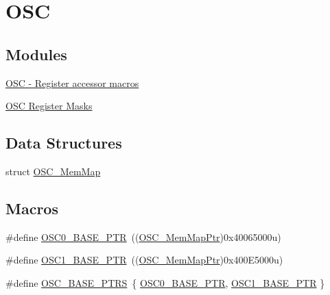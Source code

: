 \hypertarget{group___o_s_c___peripheral}{}\section{O\+S\+C}
\label{group___o_s_c___peripheral}
\subsection*{Modules}
\begin{DoxyCompactItemize}
\item 
\hyperlink{group___o_s_c___register___accessor___macros}{O\+S\+C -\/ Register accessor macros}
\item 
\hyperlink{group___o_s_c___register___masks}{O\+S\+C Register Masks}
\end{DoxyCompactItemize}
\subsection*{Data Structures}
\begin{DoxyCompactItemize}
\item 
struct \hyperlink{struct_o_s_c___mem_map}{O\+S\+C\+\_\+\+Mem\+Map}
\end{DoxyCompactItemize}
\subsection*{Macros}
\begin{DoxyCompactItemize}
\item 
\#define \hyperlink{group___o_s_c___peripheral_gaab1618c69a91b2e5d3385139b5b566f0}{O\+S\+C0\+\_\+\+B\+A\+S\+E\+\_\+\+P\+T\+R}~((\hyperlink{group___o_s_c___peripheral_gaaa685163f549fdf24c28ec9b400310b5}{O\+S\+C\+\_\+\+Mem\+Map\+Ptr})0x40065000u)
\item 
\#define \hyperlink{group___o_s_c___peripheral_ga5a0e46e15931232a6e0cafb7315041fa}{O\+S\+C1\+\_\+\+B\+A\+S\+E\+\_\+\+P\+T\+R}~((\hyperlink{group___o_s_c___peripheral_gaaa685163f549fdf24c28ec9b400310b5}{O\+S\+C\+\_\+\+Mem\+Map\+Ptr})0x400\+E5000u)
\item 
\#define \hyperlink{group___o_s_c___peripheral_ga46f69fcb9d660e18b5cbf51adbbcec78}{O\+S\+C\+\_\+\+B\+A\+S\+E\+\_\+\+P\+T\+R\+S}~\{ \hyperlink{group___o_s_c___peripheral_gaab1618c69a91b2e5d3385139b5b566f0}{O\+S\+C0\+\_\+\+B\+A\+S\+E\+\_\+\+P\+T\+R}, \hyperlink{group___o_s_c___peripheral_ga5a0e46e15931232a6e0cafb7315041fa}{O\+S\+C1\+\_\+\+B\+A\+S\+E\+\_\+\+P\+T\+R} \}
\end{DoxyCompactItemize}
